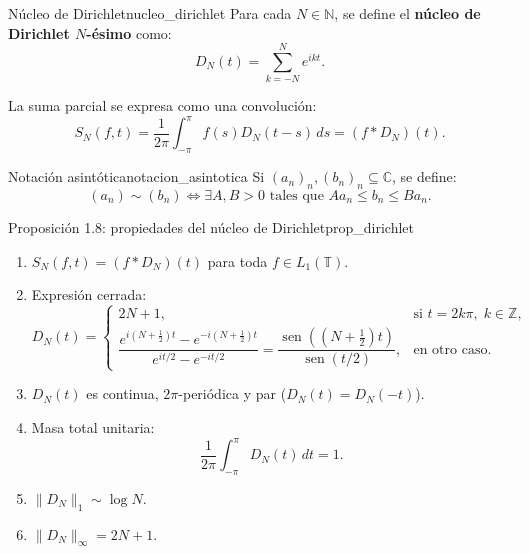 \begin{definicion}{Núcleo de Dirichlet}{nucleo_dirichlet}
Para cada $N \in \mathbb{N}$, se define el \textbf{núcleo de Dirichlet $N$-ésimo} como:
\[
D_N(t) = \sum_{k=-N}^N e^{ikt}.
\]
\end{definicion}

La suma parcial se expresa como una convolución:
\[
S_N(f, t) = \frac{1}{2\pi} \int_{-\pi}^\pi f(s) D_N(t - s) \, ds = (f * D_N)(t).
\]

\begin{nota}{Notación asintótica}{notacion_asintotica}
Si $(a_n)_n, (b_n)_n \subseteq \mathbb{C}$, se define:
\[
(a_n) \sim (b_n) \iff \exists A, B > 0 \text{ tales que } A a_n \le b_n \le B a_n.
\]
\end{nota}

\begin{proposicion}{Proposición 1.8: propiedades del núcleo de Dirichlet}{prop_dirichlet}
\begin{enumerate}
    \item $S_N(f, t) = (f * D_N)(t)$ para toda $f \in L_1(\mathbb{T})$.
    \item Expresión cerrada:
    \[
    D_N(t) = \begin{cases}
    2N + 1, & \text{si } t = 2k\pi, \; k \in \mathbb{Z}, \\[1ex]
    \dfrac{e^{i\left(N + \frac{1}{2}\right)t} - e^{-i\left(N + \frac{1}{2}\right)t}}{e^{i t/2} - e^{-i t/2}} = \dfrac{\operatorname{sen}\left(\left(N + \frac{1}{2}\right)t\right)}{\operatorname{sen}(t/2)}, & \text{en otro caso.}
    \end{cases}
    \]
    \item $D_N(t)$ es continua, $2\pi$-periódica y par ($D_N(t) = D_N(-t)$).
    \item Masa total unitaria:
    \[
    \frac{1}{2\pi} \int_{-\pi}^\pi D_N(t) \, dt = 1.
    \]
    \item $\|D_N\|_1 \sim \log N$.
    \item $\|D_N\|_\infty = 2N + 1$.
\end{enumerate}
\end{proposicion}

